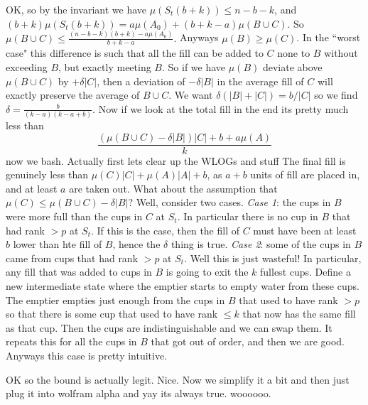 \documentclass[twocolumn]{article}[11pt]
\begin{document}
OK, so by the invariant we have $\mu(S_t(b+k)) \le n-b-k$, and $(b+k)\mu(S_t(b+k)) = a\mu(A_0) + (b+k-a)\mu(B\cup C)$.
So $\mu(B\cup C) \le \frac{(n-b-k)(b+k) - a\mu(A_0)}{b+k-a}.$
Anyways $\mu(B) \ge \mu(C)$.
In the ``worst case" this difference is such that all the fill can be added to $C$ none to $B$ without exceeding $B$, but exactly meeting $B$.
So if we have $\mu(B)$ deviate above $\mu(B\cup C)$ by $+\delta|C|$, then a deviation of $-\delta|B|$ in the average fill of $C$ will exactly preserve the average of $B \cup C$.
We want $\delta(|B|+|C|) = b/|C|$ so we find $\delta = \frac{b}{(k-a)(k-a+b)}$.
Now if we look at the total fill in the end its pretty much less than
$$\frac{(\mu(B\cup C) -\delta|B|)|C| + b + a\mu(A)}{k}$$
now we bash.
Actually first lets clear up the WLOGs and stuff
The final fill is genuinely less than $\mu(C)|C| + \mu(A)|A| + b$, as $a+b$ units of fill are placed in, and at least $a$ are taken out.
What about the assumption that $\mu(C) \le \mu(B\cup C) - \delta |B|$?
Well, consider two cases.
\emph{Case 1}: the cups in $B$ were more full than the cups in $C$ at $S_t$. In
particular there is no cup in $B$ that had rank $>p$ at $S_t$. If this is the
case, then the fill of $C$ must have been at least $b$ lower than hte fill of
$B$, hence the $\delta$ thing is true. 
\emph{Case 2}: some of the cups in $B$ came from cups that had rank $>p$ at $S_t$.
Well this is just wasteful! In particular, any fill that was added to cups in
$B$ is going to exit the $k$ fullest cups. Define a new intermediate state
where the emptier starts to empty water from these cups. The emptier empties
just enough from the cups in $B$ that used to have rank $> p$ so that there is
some cup that used to have rank $\le k$ that now has the same fill as that cup.
Then the cups are indistinguishable and we can swap them. It repeats this for
all the cups in $B$ that got out of order, and then we are good. Anyways this
case is pretty intuitive.

OK so the bound is actually legit. Nice.
Now we simplify it a bit and then just plug it into  wolfram alpha and yay its always true. woooooo.
\end{document}
